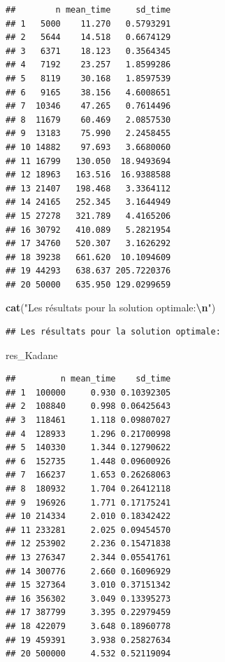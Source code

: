 \documentclass[
]{article}
\newenvironment{Shaded}{\begin{snugshade}}{\end{snugshade}}
\newcommand{\FunctionTok}[1]{\textcolor[rgb]{0.13,0.29,0.53}{\textbf{#1}}}
\newcommand{\NormalTok}[1]{#1}
\newcommand{\SpecialCharTok}[1]{\textcolor[rgb]{0.81,0.36,0.00}{\textbf{#1}}}
\newcommand{\StringTok}[1]{\textcolor[rgb]{0.31,0.60,0.02}{#1}}
\begin{document}
\begin{verbatim}
##        n mean_time     sd_time
## 1   5000    11.270   0.5793291
## 2   5644    14.518   0.6674129
## 3   6371    18.123   0.3564345
## 4   7192    23.257   1.8599286
## 5   8119    30.168   1.8597539
## 6   9165    38.156   4.6008651
## 7  10346    47.265   0.7614496
## 8  11679    60.469   2.0857530
## 9  13183    75.990   2.2458455
## 10 14882    97.693   3.6680060
## 11 16799   130.050  18.9493694
## 12 18963   163.516  16.9388588
## 13 21407   198.468   3.3364112
## 14 24165   252.345   3.1644949
## 15 27278   321.789   4.4165206
## 16 30792   410.089   5.2821954
## 17 34760   520.307   3.1626292
## 18 39238   661.620  10.1094609
## 19 44293   638.637 205.7220376
## 20 50000   635.950 129.0299659
\end{verbatim}

\begin{Shaded}
\begin{Highlighting}[]
\FunctionTok{cat}\NormalTok{(}\StringTok{"Les résultats pour la solution optimale:}\SpecialCharTok{\textbackslash{}n}\StringTok{"}\NormalTok{)}
\end{Highlighting}
\end{Shaded}

\begin{verbatim}
## Les résultats pour la solution optimale:
\end{verbatim}

\begin{Shaded}
\begin{Highlighting}[]
\NormalTok{res\_Kadane}
\end{Highlighting}
\end{Shaded}

\begin{verbatim}
##         n mean_time    sd_time
## 1  100000     0.930 0.10392305
## 2  108840     0.998 0.06425643
## 3  118461     1.118 0.09807027
## 4  128933     1.296 0.21700998
## 5  140330     1.344 0.12790622
## 6  152735     1.448 0.09600926
## 7  166237     1.653 0.26268063
## 8  180932     1.704 0.26412118
## 9  196926     1.771 0.17175241
## 10 214334     2.010 0.18342422
## 11 233281     2.025 0.09454570
## 12 253902     2.236 0.15471838
## 13 276347     2.344 0.05541761
## 14 300776     2.660 0.16096929
## 15 327364     3.010 0.37151342
## 16 356302     3.049 0.13395273
## 17 387799     3.395 0.22979459
## 18 422079     3.648 0.18960778
## 19 459391     3.938 0.25827634
## 20 500000     4.532 0.52119094
\end{verbatim}
\end{document}
